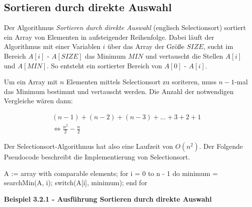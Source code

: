 \subsection{Sortieren durch direkte Auswahl}

Der Algorithmus \textit{Sortieren durch direkte Auswahl} (englisch Selectionsort) sortiert ein Array von Elementen in aufsteigender Reihenfolge. Dabei läuft der Algorithmus mit einer Variablen $i$ über das Array der Größe $SIZE$, sucht im Bereich $A[i]$ - $A[SIZE]$ das Minimum $MIN$ und vertauscht die Stellen $A[i]$ und $A[MIN]$. So entsteht ein sortierter Bereich von $A[0]$ - $A[i]$.

Um ein Array mit $n$ Elementen mittels Selectionsort zu soriteren, muss $n-1$-mal das Minimum bestimmt und vertauscht werden. Die Anzahl der notwendigen Vergleiche wären dann:

\begin{gather*}
	(n-1) + (n-2)  +(n-3)+ ... + 3 + 2 + 1\\
	\Leftrightarrow \frac{n^2}{2} - \frac{n}{2}
\end{gather*}

\noindent
Der Selectionsort-Algorithmus hat also eine Laufzeit von $O(n^2)$. Der Folgende Pseudocode beschreibt die Implementierung von Selectionsort.

\begin{PseudoCode}
A := array with comparable elements;
for i = 0 to n - 1 do
	minimum = searchMin(A, i);
	switch(A[i], minimum);
end for
\end{PseudoCode}

\noindent
\textbf{Beispiel 3.2.1 - Ausführung Sortieren durch direkte Auswahl}

